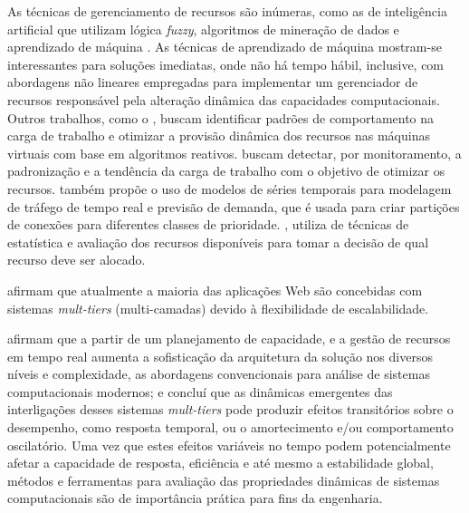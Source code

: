 As técnicas de gerenciamento de recursos são inúmeras, como as de inteligência artificial que utilizam lógica \textit{fuzzy}, algoritmos de mineração de dados e aprendizado de máquina \cite{Nobile2013}. As técnicas de aprendizado de máquina mostram-se interessantes para soluções imediatas, onde não há tempo hábil, inclusive, com abordagens não lineares empregadas para implementar um gerenciador de recursos responsável pela alteração dinâmica das capacidades computacionais. Outros trabalhos, como o , buscam identificar padrões de comportamento na carga de trabalho e otimizar a provisão dinâmica dos recursos nas máquinas virtuais com base em algoritmos reativos.  buscam detectar, por monitoramento, a padronização e a tendência da carga de trabalho com o objetivo de otimizar os recursos.  também propõe o uso de modelos de séries temporais para modelagem de tráfego de tempo real e previsão de demanda, que é usada para criar partições de conexões para diferentes classes de prioridade. , utiliza de técnicas de estatística e avaliação dos recursos disponíveis para tomar a decisão de qual recurso deve ser alocado.

 afirmam que atualmente a maioria das aplicações Web são concebidas com sistemas \textit{mult-tiers} (multi-camadas) devido à flexibilidade de escalabilidade.%

 afirmam que a partir de um planejamento de capacidade, e a gestão de recursos em tempo real aumenta a sofisticação da arquitetura da solução nos diversos níveis e complexidade, as abordagens convencionais para análise de sistemas computacionais modernos; e concluí que as dinâmicas emergentes das interligações desses sistemas \textit{mult-tiers} pode produzir efeitos transitórios sobre o desempenho, como resposta temporal, ou o amortecimento e/ou comportamento oscilatório. Uma vez que estes efeitos variáveis no tempo podem potencialmente afetar a capacidade de resposta, eficiência e até mesmo a estabilidade global, métodos e ferramentas para avaliação das propriedades dinâmicas de sistemas computacionais são de importância prática para fins da engenharia.

